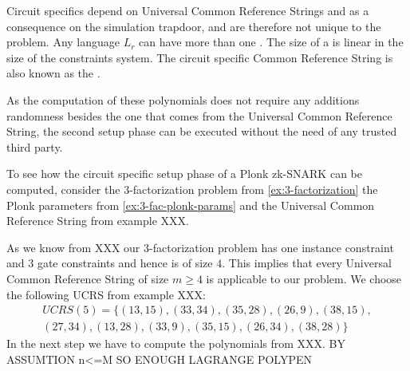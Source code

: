 Circuit specifics depend on Universal Common Reference Strings and as a consequence on the simulation trapdoor, and are therefore not unique to the problem. Any language $L_r$ can have more than one . The  size of a  is linear in the size of the constraints system. The circuit specific Common Reference String is also known as the .

As the computation of these polynomials does not require any additions randomness besides the one that comes from the Universal Common Reference String, the second setup phase can be executed without the need of any trusted third party.

\begin{example}
\label{ex:3-fac-CSCRS}
To see how the circuit specific setup phase of a Plonk zk-SNARK can be computed, consider the $3$-factorization problem from \ref{ex:3-factorization} the Plonk parameters from \examplename{} \ref{ex:3-fac-plonk-params} and the Universal Common Reference String from example XXX. 

As we know from XXX our $3$-factorization problem has one instance constraint and $3$ gate constraints and hence is of size $4$. This implies that every Universal Common Reference String of size $m\geq 4$ is applicable to our problem. We choose the following UCRS from example XXX:
\begin{multline*}
UCRS(5) =\{(13,15), (33,34), (35,28), (26,9), (38,15), \\
(27,34), (13,28), (33,9), (35,15), (26,34), (38,28)\}
\end{multline*}
In the next step we have to compute the polynomials from XXX. BY ASSUMTION n<=M SO ENOUGH LAGRANGE POLYPEN


\end{example}
